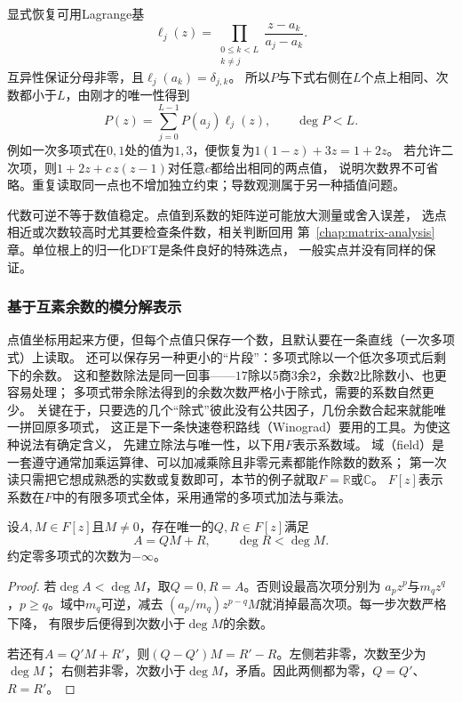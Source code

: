显式恢复可用Lagrange基
\[
  \ell_j(z)=\prod_{\substack{0\leq k<L\\k\neq j}}
  \frac{z-a_k}{a_j-a_k}.
\]
互异性保证分母非零，且$\ell_j(a_k)=\delta_{j,k}$。
所以$P$与下式右侧在$L$个点上相同、次数都小于$L$，由刚才的唯一性得到
\begin{equation}
  P(z)=\sum_{j=0}^{L-1}P(a_j)\ell_j(z),\qquad\deg P<L.
  \label{eq:signal-analysis-lagrange-interpolation}
\end{equation}
例如一次多项式在$0,1$处的值为$1,3$，便恢复为$1(1-z)+3z=1+2z$。
若允许二次项，则$1+2z+c\,z(z-1)$对任意$c$都给出相同的两点值，
说明次数界不可省略。重复读取同一点也不增加独立约束；导数观测属于另一种插值问题。

代数可逆不等于数值稳定。点值到系数的矩阵逆可能放大测量或舍入误差，
选点相近或次数较高时尤其要检查条件数，相关判断回用
第~\ref{chap:matrix-analysis}章。单位根上的归一化DFT是条件良好的特殊选点，
一般实点并没有同样的保证。

\subsubsection{基于互素余数的模分解表示}

点值坐标用起来方便，但每个点值只保存一个数，且默认要在一条直线（一次多项式）上读取。
还可以保存另一种更小的“片段”：多项式除以一个低次多项式后剩下的余数。
这和整数除法是同一回事——$17$除以$5$商$3$余$2$，余数$2$比除数小、也更容易处理；
多项式带余除法得到的余数次数严格小于除式，需要的系数自然更少。
关键在于，只要选的几个“除式”彼此没有公共因子，几份余数合起来就能唯一拼回原多项式，
这正是下一条快速卷积路线（Winograd）要用的工具。为使这种说法有确定含义，
先建立除法与唯一性，以下用$F$表示系数域。
域（field）是一套遵守通常加乘运算律、可以加减乘除且非零元素都能作除数的数系；
第一次读只需把它想成熟悉的实数或复数即可，本节的例子就取$F=\mathbb R$或$\mathbb C$。
$F[z]$表示系数在$F$中的有限多项式全体，采用通常的多项式加法与乘法。
\begin{theorem}[多项式带余除法]
  \label{thm:signal-analysis-polynomial-division}
  设$A,M\in F[z]$且$M\neq0$，存在唯一的$Q,R\in F[z]$满足
  \[
    A=QM+R,\qquad\deg R<\deg M.
  \]
  约定零多项式的次数为$-\infty$。
\end{theorem}
\begin{proof}
  若$\deg A<\deg M$，取$Q=0,R=A$。否则设最高次项分别为
  $a_pz^p$与$m_qz^q$，$p\geq q$。域中$m_q$可逆，减去
  $(a_p/m_q)z^{p-q}M$就消掉最高次项。每一步次数严格下降，
  有限步后便得到次数小于$\deg M$的余数。

  若还有$A=Q'M+R'$，则$(Q-Q')M=R'-R$。左侧若非零，次数至少为$\deg M$；
  右侧若非零，次数小于$\deg M$，矛盾。因此两侧都为零，$Q=Q'$、$R=R'$。
\end{proof}

